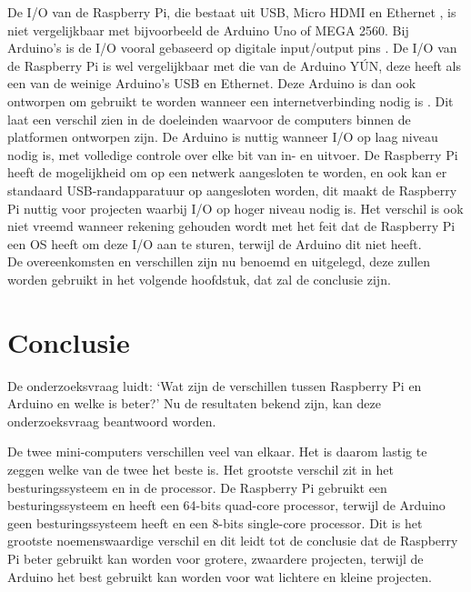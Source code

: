 \documentclass[a4paper, dutch, abstract=true]{scrartcl}
\begin{document}
De I/O van de Raspberry Pi, die bestaat uit USB, Micro HDMI en Ethernet \cite{raspberry20194bspecs},
is niet vergelijkbaar met bijvoorbeeld de Arduino Uno of MEGA 2560.
Bij Arduino's is de I/O vooral gebaseerd op digitale input/output pins
\cite{arduino2019mega,arduino2019uno}.
De I/O van de Raspberry Pi is wel vergelijkbaar met die van de Arduino Y{\'U}N, deze heeft als een
van de weinige Arduino's USB en Ethernet.
Deze Arduino is dan ook ontworpen om gebruikt te worden wanneer een internetverbinding nodig is
\cite{arduino2019yun}.
Dit laat een verschil zien in de doeleinden waarvoor de computers binnen de platformen ontworpen
zijn.
De Arduino is nuttig wanneer I/O op laag niveau nodig is, met volledige controle over elke bit van
in- en uitvoer.
De Raspberry Pi heeft de mogelijkheid om op een netwerk aangesloten te worden, en ook kan er
standaard USB-randapparatuur op aangesloten worden, dit maakt de Raspberry Pi nuttig voor projecten
waarbij I/O op hoger niveau nodig is.
Het verschil is ook niet vreemd wanneer rekening gehouden wordt met het feit dat de Raspberry Pi een
OS heeft om deze I/O aan te sturen, terwijl de Arduino dit niet heeft.
\\


De overeenkomsten en verschillen zijn nu benoemd en uitgelegd, deze zullen worden gebruikt in het
volgende hoofdstuk, dat zal de conclusie zijn.

\section{Conclusie}
De onderzoeksvraag luidt: `Wat zijn de verschillen tussen Raspberry Pi en Arduino en welke is
beter?'
Nu de resultaten bekend zijn, kan deze onderzoeksvraag beantwoord worden.

De twee mini-computers verschillen veel van elkaar.
Het is daarom lastig te zeggen welke van de twee het beste is.
Het grootste verschil zit in het besturingssysteem en in de processor.
De Raspberry Pi gebruikt een besturingssysteem en heeft een 64-bits quad-core processor, terwijl de
Arduino geen besturingssysteem heeft en een 8-bits single-core processor.
Dit is het grootste noemenswaardige verschil en dit leidt tot de conclusie dat de Raspberry Pi beter
gebruikt kan worden voor grotere, zwaardere projecten, terwijl de Arduino het best gebruikt kan
worden voor wat lichtere en kleine projecten.
\end{document}
